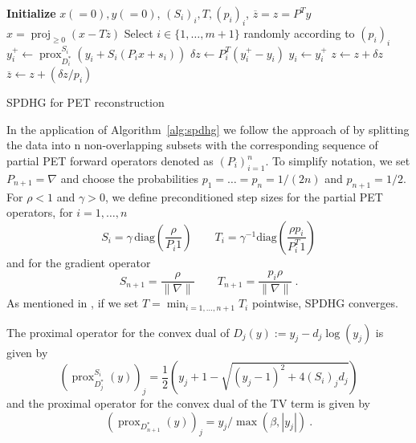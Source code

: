\documentclass[11pt,twocolumn,twoside]{article}
\DeclareMathOperator{\proj}{proj}
\DeclareMathOperator{\prox}{prox}
\begin{document}
\begin{algorithm}[t]
\begin{algorithmic}[1]
\State \textbf{Initialize} $x(=0),y(=0)$, $(S_i)_i,T,(p_i)_i$,
\State $\overline{z} = z = P^T y$
\Repeat
	\State $x = \proj_{\geq 0} (x - T \overline{z})$
	\State Select $i \in \{ 1,\ldots,m+1\} $ randomly according to $(p_i)_i$
	\State \quad $y_i^+ \gets \prox_{D_i^*}^{S_i} ( y_i + S_i  ( P_i x + s_i))$
	\State \quad $\delta z \gets P_i^T (y_i^+ - y_i)$
	\State \quad $y_i \gets y_i^+$
	\State $z \gets z + \delta z$
	\State $\overline{z} \gets  z + (\delta z/p_i)$
\State {}
\end{algorithmic}
\caption{SPDHG for PET reconstruction \cite{Ehrhardt2019}}
\label{alg:spdhg}
\end{algorithm}

In the application of Algorithm~\ref{alg:spdhg} we follow the approach of \cite{Ehrhardt2019}
by splitting the data into n non-overlapping subsets with the corresponding 
sequence of partial PET forward operators denoted as $(P_i)_{i=1}^n$.
To simplify notation, we set $P_{n+1} = \nabla$ and choose the probabilities $p_1=\ldots=p_n = 1/(2n)$
and $p_{n+1} = 1/2$.
For $\rho<1$ and $\gamma>0$, we define preconditioned step sizes for the partial PET operators, 
for $i=1,\ldots,n$
\[ S_i = \gamma \, \text{diag}(\frac{\rho}{P_i 1} )\qquad  T_i = \gamma^{-1} \text{diag}(\frac{\rho p_i}{P^T_i 1}) \]
and for the gradient operator
\[ S_{n+1} = \frac{\rho}{\|\nabla\|} \qquad T_{n+1} = \frac{p_i\rho}{\|\nabla\|} \ . \]
As mentioned in \cite{Ehrhardt2019}, if we set $T = \min_{i=1,\ldots,n+1} T_i$ pointwise,
SPDHG converges.

The proximal operator for the convex dual of $D_j(y):= y_j  - d_j \log (y_j)$ is given by
\begin{equation}
(\prox_{D_j^*}^{S_i}(y))_j = \frac{1}{2} \left(y_j + 1 - \sqrt{ (y_j-1)^2 + 4 (S_i)_j d_j} \right)
\label{eq:proxD}
\end{equation} 
and the proximal operator for the convex dual of the TV term is given by
\begin{equation}
(\prox_{D_{n+1}^*}(y) )_j = y_j /\max(\beta,|y_j|) \ .
\end{equation}
\end{document}
